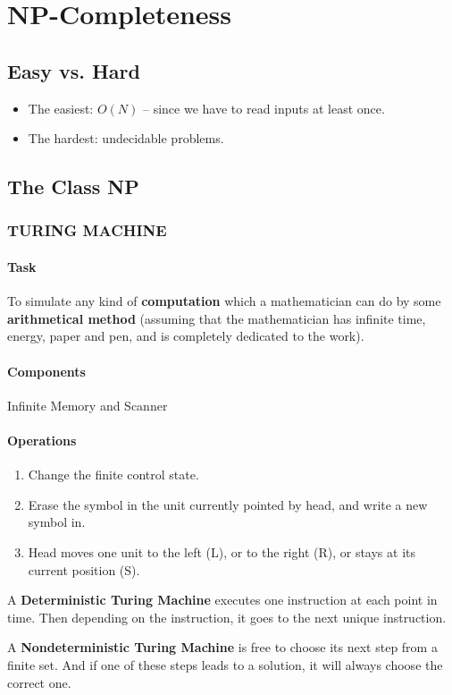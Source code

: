 \newpage
\section{NP-Completeness}

\subsection{Easy vs. Hard}
\begin{itemize}
    \item The easiest: $O(N)$ – since we have to read inputs at least once.
    \item The hardest: undecidable problems.
\end{itemize}

\subsection{The Class NP}

\subsubsection{TURING MACHINE}

\paragraph{Task} To simulate any kind of \textbf{computation} which a mathematician can do by some \textbf{arithmetical method} (assuming that the mathematician has infinite time, energy, paper and pen, and is completely dedicated to the work).

\paragraph{Components} Infinite Memory and Scanner

\paragraph{Operations} 
\begin{enumerate}
    \item Change the finite control state.
    \item Erase the symbol in the unit currently pointed by head, and write a new symbol in.
    \item Head moves one unit to the left (L), or to the right (R), or stays at its current position (S).
\end{enumerate}
{\small

A \textbf{Deterministic Turing Machine} executes one instruction at each point in time.  Then depending on the instruction, it goes to the next unique instruction.

A \textbf{Nondeterministic Turing Machine} is \textcolor{light_red}{free to choose} its next step from a finite set. And if one of these steps leads to a solution, it will \textcolor{light_red}{always choose the correct one}.

}

